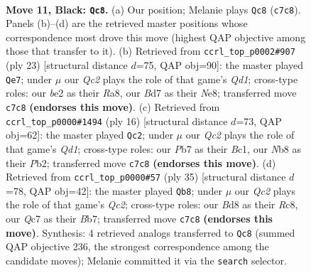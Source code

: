 \documentclass[11pt]{article}
\begin{document}
\clearpage

\begin{figure}[p]\centering
\begin{subfigure}{0.46\textwidth}\centering
\resizebox{\linewidth}{!}{%
\newchessgame
\chessboard[
  setfen={rn1b1rk1/ppqb1ppp/4pn2/2Pp4/3P4/2N2N2/PP1BBPPP/2RQ1RK1 b - - 8 11},
  showmover=false,
  pgfstyle=straightmove, color=movearrow, markmove={c7-c8}
]}
\caption{}
\end{subfigure}\hfill
\begin{subfigure}{0.46\textwidth}\centering
\resizebox{\linewidth}{!}{%
\newchessgame
\chessboard[
  setfen={r1bqnrk1/1pp3bp/n4pp1/p2Pp3/2P1P2B/2NB1N2/PP4PP/R2Q1RK1 b - - 1 12},
  showmover=false,
  pgfstyle=straightmove, color=movearrow, markmove={d8-e7}
]}
\caption{}
\end{subfigure}
\\[4pt]
\begin{subfigure}{0.46\textwidth}\centering
\resizebox{\linewidth}{!}{%
\newchessgame
\chessboard[
  setfen={r1bq1rk1/pp1nbppp/2p2n2/4p3/2P5/2N2NP1/PP2PPBP/R1BQ1RK1 w - - 2 9},
  showmover=false,
  pgfstyle=straightmove, color=movearrow, markmove={d1-c2}
]}
\caption{}
\end{subfigure}\hfill
\begin{subfigure}{0.46\textwidth}\centering
\resizebox{\linewidth}{!}{%
\newchessgame
\chessboard[
  setfen={2r1kb1r/1bqn1ppp/p4n2/3PpP2/Pp2B3/1N6/1PPN1BPP/2RQ1RK1 b k - 6 18},
  showmover=false,
  pgfstyle=straightmove, color=movearrow, markmove={c7-b8}
]}
\caption{}
\end{subfigure}
\caption{\textbf{Move 11, Black: \texttt{Qc8}.} (a) Our position; Melanie plays \texttt{Qc8} (\texttt{c7c8}). Panels (b)--(d) are the retrieved master positions whose correspondence most drove this move (highest QAP objective among those that transfer to it). (b) Retrieved from \texttt{ccrl\_top\_p0002\#907} (ply 23) [structural distance $d$=75, QAP obj=90]: the master played \texttt{Qe7}; under $\mu$ our \emph{Qc2} plays the role of that game's \emph{Qd1}; cross-type roles: our \emph{b}e2 as their \emph{R}a8, our \emph{B}d7 as their \emph{N}e8; transferred move \texttt{c7c8} \textbf{(endorses this move)}. (c) Retrieved from \texttt{ccrl\_top\_p0000\#1494} (ply 16) [structural distance $d$=73, QAP obj=62]: the master played \texttt{Qc2}; under $\mu$ our \emph{Qc2} plays the role of that game's \emph{Qd1}; cross-type roles: our \emph{P}b7 as their \emph{B}c1, our \emph{N}b8 as their \emph{P}b2; transferred move \texttt{c7c8} \textbf{(endorses this move)}. (d) Retrieved from \texttt{ccrl\_top\_p0000\#57} (ply 35) [structural distance $d$=78, QAP obj=42]: the master played \texttt{Qb8}; under $\mu$ our \emph{Qc2} plays the role of that game's \emph{Qc2}; cross-type roles: our \emph{B}d8 as their \emph{R}c8, our \emph{Q}c7 as their \emph{B}b7; transferred move \texttt{c7c8} \textbf{(endorses this move)}. Synthesis: 4 retrieved analogs transferred to \texttt{Qc8} (summed QAP objective 236, the strongest correspondence among the candidate moves); Melanie committed it via the \texttt{search} selector.}
\label{fig:thought-m21}
\end{figure}
\end{document}
